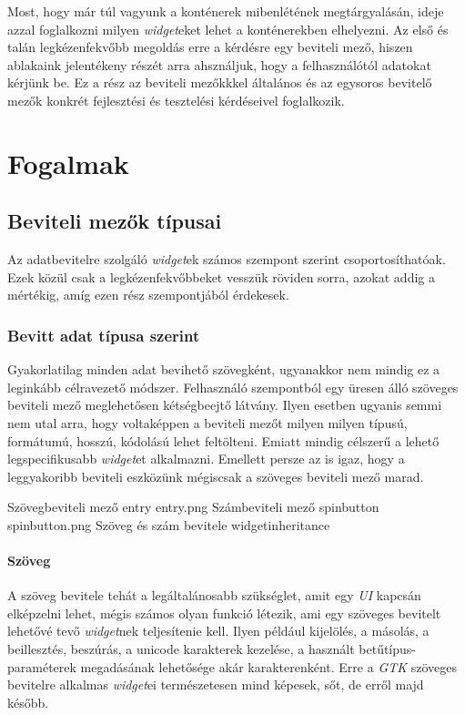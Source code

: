 Most, hogy már túl vagyunk a konténerek mibenlétének megtárgyalásán, ideje azzal foglalkozni milyen \textit{widget}eket lehet a konténerekben elhelyezni. Az első és talán legkézenfekvőbb megoldás erre a kérdésre egy beviteli mező, hiszen ablakaink jelentékeny részét arra ahsználjuk, hogy a felhasználótól adatokat kérjünk be. Ez a rész az beviteli mezőkkkel általános és az egysoros bevitelő mezők konkrét fejlesztési és tesztelési kérdéseivel foglalkozik.

\section{Fogalmak}

\subsection{Beviteli mezők típusai}

Az adatbevitelre szolgáló \textit{widget}ek számos szempont szerint csoportosíthatóak. Ezek közül csak a legkézenfekvőbbeket vesszük röviden sorra, azokat addig a mértékig, amíg ezen rész szempontjából érdekesek.

\subsubsection{Bevitt adat típusa szerint}

Gyakorlatilag minden adat bevihető szövegként, ugyanakkor nem mindig ez a leginkább célravezető módszer. Felhasználó szempontból egy üresen álló szöveges beviteli mező meglehetősen kétségbeejtő látvány. Ilyen esetben ugyanis semmi nem utal arra, hogy voltaképpen a beviteli mezőt milyen milyen típusú, formátumú, hosszú, kódolású lehet feltölteni. Emiatt mindig célszerű a lehető legspecifikusabb \textit{widget}et alkalmazni. Emellett persze az is igaz, hogy a leggyakoribb beviteli eszközünk mégiscsak a szöveges beviteli mező marad.

{Szövegbeviteli mező\cite{gtkref}}
{entry}
{entry.png}
{Számbeviteli mező\cite{gtkref}}
{spinbutton}
{spinbutton.png}
{Szöveg és szám bevitele}
{widgetinheritance}


\paragraph{Szöveg}

A szöveg bevitele tehát a legáltalánosabb szükséglet, amit egy \textit{UI} kapcsán elképzelni lehet, mégis számos olyan funkció létezik, ami egy szöveges bevitelt lehetővé tevő \textit{widget}nek teljesítenie kell. Ilyen például kijelölés, a másolás, a beillesztés, beszúrás, a unicode karakterek kezelése, a használt betűtípus-paraméterek megadásának lehetősége akár karakterenként. Erre a \textit{GTK} szöveges bevitelre alkalmas \textit{widget}ei természetesen mind képesek, sőt, de erről majd később.

